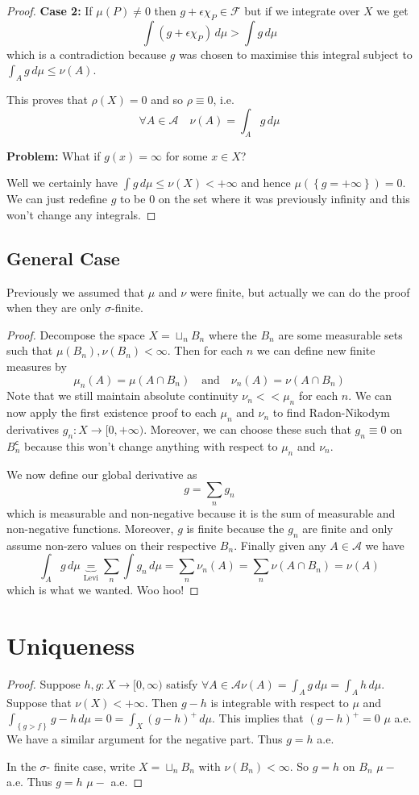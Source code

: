 \documentclass[11pt]{article}
\newcommand{\dm}{\ensuremath{\,d\mu}}
\newcommand{\stcmp}{^{\mathsf{c}}}
\begin{document}
\begin{proof}
\textbf{Case 2: }If $\mu(P)\neq 0$ then $g+ \epsilon\chi_P \in \mathcal{F}$ but if we integrate over $X$ we get
\[
	\int (g+ \epsilon\chi_P)\dm > \int g \dm
\]
which is a contradiction because $g$ was chosen to maximise this integral subject to $\int_A g \dm \leq \nu (A)$.

This proves that $\rho(X)=0$ and so $\rho\equiv 0$, i.e.
\[
	\forall A \in \mathcal{A} \quad \nu(A) = \int_A g \dm
\]

\textbf{Problem: }What if $g(x) = \infty$ for some $x\in X$?

Well we certainly have $\int g \dm \leq \nu (X) < +\infty$ and hence $\mu\left(\left\{g = +\infty\right\}\right)=0$.
We can just redefine $g$ to be $0$ on the set where it was previously infinity and this won't change any integrals.
\end{proof}

\subsection{General Case}
Previously we assumed that $\mu$ and $\nu$ were finite, but actually we can do the proof when they are only $\sigma$-finite.

\begin{proof}
Decompose the space $X=\sqcup_n B_n$ where the $B_n$ are some measurable sets such that $\mu(B_n),\nu(B_n)< \infty$.
Then for each $n$ we can define new finite measures by 
\[
	\mu_n(A)= \mu(A\cap B_n)\quad\text{and}\quad\nu_n(A)=\nu(A\cap B_n)
\]
Note that we still maintain absolute continuity $\nu_n << \mu_n$ for each $n$.
We can now apply the first existence proof to each $\mu_n$ and $\nu_n$ to find Radon-Nikodym derivatives $g_n:X\to[0, +\infty)$.
Moreover, we can choose these such that $g_n\equiv 0$ on $B_n\stcmp$ because this won't change anything with respect to $\mu_n$ and $\nu_n$.

We now define our global derivative as
\[
	g=\sum_{n}g_n
\]
which is measurable and non-negative because it is the sum of measurable and non-negative functions.
Moreover, $g$ is finite because the $g_n$ are finite and only assume non-zero values on their respective $B_n$.
Finally given any $A\in\mathcal{A}$ we have
\[
	\int_A g \dm \underbrace{=}_{\text{Levi}} \sum_n\int g_n\dm = \sum_n \nu_n(A) = \sum _n \nu(A\cap B_n) = \nu(A)
\]
which is what we wanted.
Woo hoo! \Cooley
\end{proof}

\section{Uniqueness}
\begin{proof}
Suppose $h,g : X \to [0, \infty)$ satisfy $\forall A \in \mathcal{A} \nu(A) = \int_A g \dm = \int_A h \dm$. 
Suppose that $\nu (X) < +\infty$.
Then $g-h$ is integrable with respect to $\mu$ and $\int_{\left\{g>f\right\}} g-h \dm = 0 = \int_X (g-h)^+ \dm$. 
This implies that $(g-h)^+ = 0$ $ \mu$ a.e.
We have a similar argument for the negative part.
Thus $g=h$ a.e.

In the $\sigma$- finite case, write $X = \sqcup_n B_n$ with $\nu(B_n) < \infty$.
So $g=h$ on $B_n$ $\mu-$ a.e.
Thus $g = h$ $\mu-$ a.e. 
\end{proof}
\end{document}

